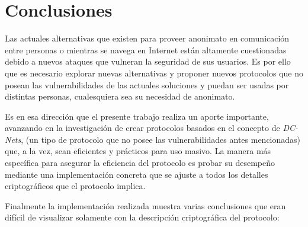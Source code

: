 \chapter{Conclusiones}\label{cap7}

Las actuales alternativas que existen para proveer anonimato en comunicación 
entre personas o mientras se navega en Internet están altamente cuestionadas 
debido a nuevos ataques que vulneran la seguridad de sus usuarios. Es por ello 
que es necesario explorar nuevas alternativas y proponer nuevos protocolos 
que no posean las vulnerabilidades de las actuales soluciones y puedan ser usadas 
por distintas personas, cualesquiera sea su necesidad de anonimato.

Es en esa dirección que el presente trabajo realiza un aporte importante, avanzando 
en la investigación de crear protocolos basados en el concepto de \emph{DC-Nets}, (un tipo de protocolo que no 
posee las vulnerabilidades antes mencionadas) que, a la vez, sean eficientes y prácticos para 
uso masivo. 
La manera más específica para asegurar la eficiencia del protocolo es probar su 
desempeño mediante una implementación concreta que se ajuste a todos los detalles criptográficos 
que el protocolo implica.

Finalmente la implementación realizada muestra varias conclusiones que eran difícil 
de visualizar solamente con la descripción criptográfica del protocolo:

